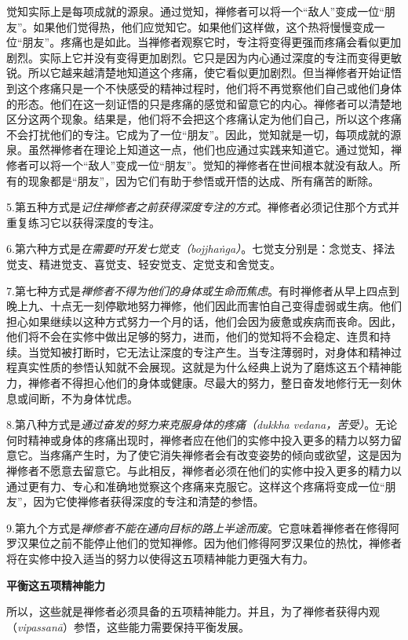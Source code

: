 \1觉知实际上是每项成就的源泉。通过觉知，禅修者可以将一个“敌人”变成一位“朋友”。如果他们觉得热，他们应觉知它。如果他们这样做，这个热将慢慢变成一位“朋友”。疼痛也是如此。当禅修者观察它时，专注将变得更强而疼痛会看似更加剧烈。实际上它并没有变得更加剧烈。它只是因为内心通过深度的专注而变得更敏锐。所以它越来越清楚地知道这个疼痛，使它看似更加剧烈。但当禅修者开始证悟到这个疼痛只是一个不快感受的精神过程时，他们将不再觉察他们自己或他们身体的形态。他们在这一刻证悟的只是疼痛的感觉和留意它的内心。禅修者可以清楚地区分这两个现象。结果是，他们将不会把这个疼痛认定为他们自己，所以这个疼痛不会打扰他们的专注。它成为了一位“朋友”。因此，觉知就是一切，每项成就的源泉。虽然禅修者在理论上知道这一点，他们也应通过实践来知道它。通过觉知，禅修者可以将一个“敌人”变成一位“朋友”。觉知的禅修者在世间根本就没有敌人。所有的现象都是“朋友”，因为它们有助于参悟或开悟的达成、所有痛苦的断除。

5.第五种方式是{\it 记住禅修者之前获得深度专注的方式}。禅修者必须记住那个方式并重复练习它以获得深度的专注。

6.第六种方式是{\it 在需要时开发七觉支（bojjha\.nga）}。七觉支分别是：念觉支、择法\1觉支、精进觉支、喜觉支、轻安觉支、定觉支和舍觉支。

7.第七种方式是{\it 禅修者不得为他们的身体或生命而焦虑}。有时禅修者从早上四点到晚上九、十点无一刻停歇地努力禅修，他们因此而害怕自己变得虚弱或生病。他们担心如果继续以这种方式努力一个月的话，他们会因为疲惫或疾病而丧命。因此，他们将不会在实修中做出足够的努力，进而，他们的觉知将不会稳定、连贯和持续。当觉知被打断时，它无法让深度的专注产生。当专注薄弱时，对身体和精神过程真实性质的参悟认知就不会展现。这就是为什么经典上说为了磨炼这五个精神能力，禅修者不得担心他们的身体或健康。尽最大的努力，整日奋发地修行无一刻休息或间断，不为身体忧虑。

8.第八种方式是{\it 通过奋发的努力来克服身体的疼痛（dukkha vedana，苦受）}。无论何时精神或身体的疼痛出现时，禅修者应在他们的实修中投入更多的精力以努力留意它。当疼痛产生时，为了使它消失禅修者会有改变姿势的倾向或欲望，这是因为禅修者不愿意去留意它。与此相反，禅修者必须在他们的实修中投入更多的精力以通过更有力、专心和准确地觉察这个疼痛来克服它。这样这个疼痛将变成一位“朋友”，因为它使禅修者获得深度的专注和清楚的参悟。

9.第九个方式是{\it 禅修者不能在通向目标的路上半途而废}。它意味着禅修者在修得阿罗汉果位之前不能停止他们的\1觉知禅修。因为他们修得阿罗汉果位的热忱，禅修者将在实修中投入适当的努力以使得这五项精神能力更强大有力。

{\medbreak\bf 平衡这五项精神能力\smallbreak}

所以，这些就是禅修者必须具备的五项精神能力。并且，为了禅修者获得内观（{\it vipassan\=a}）参悟，这些能力需要保持平衡发展。


